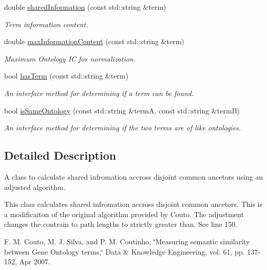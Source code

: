 \begin{DoxyCompactItemize}
double \hyperlink{classCoutoGraSMAdjustedSharedInformation_a6a228833a96e710c4e143cefaf364a37}{shared\+Information} (const std\+::string \&term)
\begin{DoxyCompactList}\small\item\em Term information content. \end{DoxyCompactList}\item 
double \hyperlink{classCoutoGraSMAdjustedSharedInformation_ab66e18a4f169878ad2a9e9d6d3feb459}{max\+Information\+Content} (const std\+::string \&term)
\begin{DoxyCompactList}\small\item\em Maximum Ontology IC for normalization. \end{DoxyCompactList}\item 
bool \hyperlink{classCoutoGraSMAdjustedSharedInformation_ae6304b98a7c8784327f978ee59372ca3}{has\+Term} (const std\+::string \&term)
\begin{DoxyCompactList}\small\item\em An interface method for determining if a term can be found. \end{DoxyCompactList}\item 
bool \hyperlink{classCoutoGraSMAdjustedSharedInformation_a9e6387f431eddaf42a1b18529cb3a8f5}{is\+Same\+Ontology} (const std\+::string \&termA, const std\+::string \&termB)
\begin{DoxyCompactList}\small\item\em An interface method for determining if the two terms are of like ontologies. \end{DoxyCompactList}\end{DoxyCompactItemize}


\subsection{Detailed Description}
A class to calculate shared infromation accross disjoint common ancetors using an adjusted algorithm. 

This class calculates shared infromation accross disjoint common ancetors. This is a modificaiton of the original algorithm provided by Couto. The adjustment changes the contrain to path lengths to strictly greater than. See line 150.

F. M. Couto, M. J. Silva, and P. M. Coutinho, \char`\"{}\+Measuring semantic similarity
between Gene Ontology terms,\char`\"{} Data \& Knowledge Engineering, vol. 61, pp. 137-\/152, Apr 2007.

